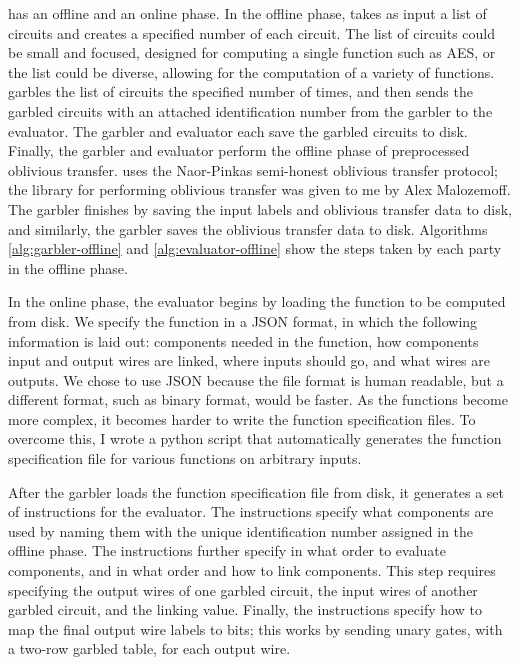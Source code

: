 \CompGC has an offline and an online phase. 
In the offline phase, \CompGC takes as input a list of circuits and creates a specified number of each circuit. 
The list of circuits could be small and focused, designed for computing a single function such as AES, or the list could be diverse, allowing for the computation of a variety of functions. 
\CompGC garbles the list of circuits the specified number of times, and then sends the garbled circuits with an attached identification number from the garbler to the evaluator. 
The garbler and evaluator each save the garbled circuits to disk. 
Finally, the garbler and evaluator perform the offline phase of preprocessed oblivious transfer. 
\CompGC uses the Naor-Pinkas semi-honest oblivious transfer protocol; the library for performing oblivious transfer was given to me by Alex Malozemoff. 
The garbler finishes by saving the input labels and oblivious transfer data to disk, and similarly, the garbler saves the oblivious transfer data to disk. 
Algorithms \ref{alg:garbler-offline} and \ref{alg:evaluator-offline} show the steps taken by each party in the offline phase. 

In the online phase, the evaluator begins by loading the function to be computed from disk. 
We specify the function in a JSON format, in which the following information is laid out: components needed in the function, how components input and output wires are linked, where inputs should go, and what wires are outputs. 
We chose to use JSON because the file format is human readable, but a different format, such as binary format, would be faster. 
As the functions become more complex, it becomes harder to write the function specification files. 
To overcome this, I wrote a python script that automatically generates the function specification file for various functions on arbitrary inputs. 

After the garbler loads the function specification file from disk, it generates a set of instructions for the evaluator. 
The instructions specify what components are used by naming them with the unique identification number assigned in the offline phase. 
The instructions further specify in what order to evaluate components, and in what order and how to link components. 
This step requires specifying the output wires of one garbled circuit, the input wires of another garbled circuit, and the linking value.
Finally, the instructions specify how to map the final output wire labels to bits; this works by sending unary gates, with a two-row garbled table, for each output wire. 

